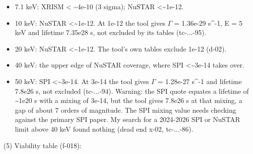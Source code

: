 \documentclass[11pt,a4paper]{article}
\begin{document}
\begin{itemize}
  \item 7.1 keV: XRISM \textless{} \textasciitilde{}4e-10 (3 sigma); NuSTAR \textless{}\textasciitilde{}1e-12.
  \item 10 keV: NuSTAR \textless{}\textasciitilde{}1e-12. At 1e-12 the tool gives $\Gamma$ = 1.36e-29 s\textasciicircum{}-1, E = 5 keV and lifetime 7.35e28 s, not excluded by its tables (tc-...-95).
  \item 20 keV: NuSTAR \textless{}\textasciitilde{}1e-12. The tool's own tables exclude 1e-12 (d-02).
  \item 40 keV: the upper edge of NuSTAR coverage, where SPI \textless{}\textasciitilde{}3e-14 takes over.
  \item 50 keV: SPI \textless{}\textasciitilde{}3e-14. At 3e-14 the tool gives $\Gamma$ = 1.28e-27 s\textasciicircum{}-1 and lifetime 7.8e26 s, not excluded (tc-...-94).
Warning: the SPI quote equates a lifetime of \textasciitilde{}1e20 s with a mixing of 3e-14, but the tool gives 7.8e26 s at that mixing, a gap of about 7 orders of magnitude. The SPI mixing value needs checking against the primary SPI paper. My search for a 2024-2026 SPI or NuSTAR limit above 40 keV found nothing (dead end x-02, tc-...-86).

\end{itemize}
(5) Viability table (f-018):
\end{document}
